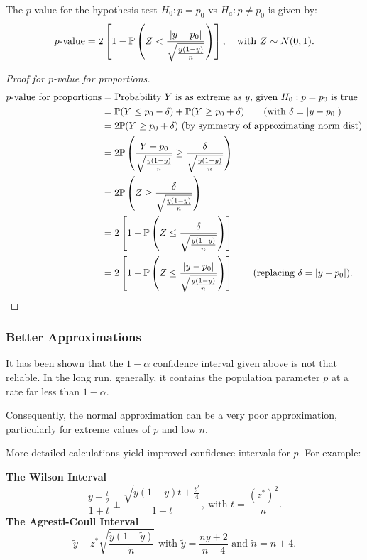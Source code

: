 \documentclass[10pt, a4paper]{article}
\begin{document}
The $p$-value for the hypothesis test $H_0 : p = p_0$ vs $H_a : p \neq p_0$ is given by:
\[
p\text{-value} = 2\left[1 - \P\left(Z < \frac{|y - p_0|}{\sqrt{\frac{y(1 - y)}{n}}}\right)\right],\quad\text{with } Z \sim N(0, 1).
\]
\begin{proof}[Proof for $p$-value for proportions]
    \begin{align*}
        p\text{-value for proportions} &= \text{Probability $Y$ is as extreme as $y$,
        given $H_0 : p = p_0$ is true} \\
        &= \P(Y \leq p_0 - \delta) + \P(Y \geq p_0 + \delta)\qquad(\text{with $\delta = |y - p_0|$}) \\
        &= 2\P(Y \geq p_0 + \delta)\ (\text{by symmetry of approximating norm dist}) \\
        &= 2\P\left(\frac{Y - p_0}{\sqrt{\frac{y(1 - y)}{n}}} \geq \frac{\delta}{\sqrt{\frac{y(1 - y)}{n}}}\right) \\
        &= 2\P\left(Z \geq \frac{\delta}{\sqrt{\frac{y(1 - y)}{n}}}\right) \\
        &= 2\left[1 - \P\left(Z \leq \frac{\delta}{\sqrt{\frac{y(1 - y)}{n}}}\right)\right] \\
        &= 2\left[1 - \P\left(Z \leq \frac{|y - p_0|}{\sqrt{\frac{y(1 - y)}{n}}}\right)\right]\qquad(\text{replacing $\delta = |y - p_0|$}).
    \end{align*}
\end{proof}

\subsubsection{Better Approximations}
It has been shown that the $1 - \alpha$ confidence interval given above is not that reliable.
In the long run,
generally,
it contains the population parameter $p$ at a rate far less than $1 - \alpha$.

Consequently,
the normal approximation can be a very poor approximation,
particularly for extreme values of $p$ and low $n$.

More detailed calculations yield improved confidence intervals for $p$.
For example:

\textbf{The Wilson Interval}
\[
\frac{y + \frac{t}{2}}{1 + t} \pm \frac{\sqrt{y(1 - y)t + \frac{t ^ 2}{4}}}{1 + t},\ \text{with } t = \frac{(z ^ {*}) ^ 2}{n}.
\]
\textbf{The Agresti-Coull Interval}
\[
\tilde{y} \pm z ^ {*}\sqrt{\frac{\tilde{y}(1 - \tilde{y})}{\tilde{n}}}\text{ with } \tilde{y} = \frac{ny + 2}{n + 4} \text{ and } \tilde{n} = n + 4.
\]
\end{document}
